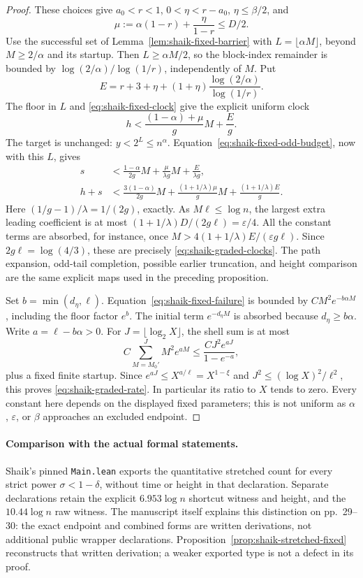 \documentclass[11pt]{article}
\theoremstyle{remark}\newtheorem{remark}[proposition]{Remark}
\begin{document}
\begin{proof}
These choices give \(a_0<r<1\), \(0<\eta<r-a_0\),
\(\eta\le\beta/2\), and
\[
 \mu:=\alpha(1-r)+\frac{\eta}{1-r}\le D/2.
\]
Use the successful set of Lemma~\ref{lem:shaik-fixed-barrier} with
\(L=\lfloor\alpha M\rfloor\), beyond \(M\ge2/\alpha\) and its startup.
Then \(L\ge\alpha M/2\), so the block-index remainder is bounded by
\(\log(2/\alpha)/\log(1/r)\), independently of \(M\).
Put
\[
 E=r+3+\eta+(1+\eta)\frac{\log(2/\alpha)}{\log(1/r)}.
\]
The floor in \(L\) and \eqref{eq:shaik-fixed-clock} give the explicit
uniform clock
\[
 h<\frac{(1-\alpha)+\mu}{g}M+\frac Eg.
\]
The target is unchanged: \(y<2^L\le n^\alpha\).
Equation~\eqref{eq:shaik-fixed-odd-budget}, now with this \(L\), gives
\begin{align*}
 s&<\frac{1-\alpha}{2g}M+\frac{\mu}{\lambda g}M+\frac E{\lambda g},\\
 h+s&<\frac{3(1-\alpha)}{2g}M+
         \frac{(1+1/\lambda)\mu}{g}M+
         \frac{(1+1/\lambda)E}{g}.
\end{align*}
Here \((1/g-1)/\lambda=1/(2g)\), exactly.
As \(M\ell\le\log n\), the largest extra leading coefficient is at most
\((1+1/\lambda)D/(2g\ell)=\varepsilon/4\).
All the constant terms are absorbed, for instance, once
\(M>4(1+1/\lambda)E/(\varepsilon g\ell)\).
Since \(2g\ell=\log(4/3)\), these are precisely
\eqref{eq:shaik-graded-clocks}.
The path expansion, odd-tail completion, possible earlier truncation,
and height comparison are the same explicit maps used in the preceding
proposition.

Set \(b=\min(d_\eta,\ell)\).
Equation~\eqref{eq:shaik-fixed-failure} is bounded by
\(C M^2e^{-b\alpha M}\), including the floor factor \(e^b\).
The initial term \(e^{-d_\eta M}\) is absorbed because
\(d_\eta\ge b\alpha\).
Write \(a=\ell-b\alpha>0\).
For \(J=\lfloor\log_2X\rfloor\), the shell sum is at most
\[
 C\sum_{M=M_0'}^J M^2e^{aM}
 \le \frac{CJ^2e^{aJ}}{1-e^{-a}},
\]
plus a fixed finite startup. Since
\(e^{aJ}\le X^{a/\ell}=X^{1-\xi}\) and
\(J^2\le(\log X)^2/\ell^2\), this proves
\eqref{eq:shaik-graded-rate}.
In particular its ratio to \(X\) tends to zero. Every constant here
depends on the displayed fixed parameters; this is not uniform as
\(\alpha\), \(\varepsilon\), or \(\beta\) approaches an excluded endpoint.
\end{proof}

\paragraph{Comparison with the actual formal statements.}
Shaik's pinned \texttt{Main.lean} exports the quantitative stretched
count for every strict power \(\sigma<1-\delta\), without time or
height in that declaration. Separate declarations retain the explicit
\(6.953\log n\) shortcut witness and height, and the \(10.44\log n\)
raw witness. The manuscript itself explains this distinction on
pp.~29--30: the exact endpoint and combined forms are written
derivations, not additional public wrapper declarations.
Proposition~\ref{prop:shaik-stretched-fixed} reconstructs that written
derivation; a weaker exported type is not a defect in its proof.
\end{document}
